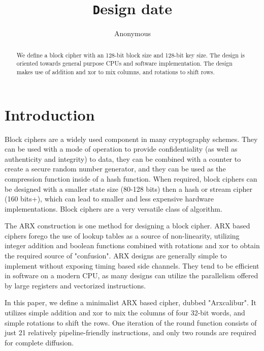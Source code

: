 \documentclass[preprint]{iacrtrans}
\author{Anonymous\inst{1}}
\institute{City, State \email{address@provider.com}}
\title[\texttt Design date]{\texttt Design date}
\begin{document}
\maketitle


\begin{abstract}
  We define a block cipher with an 128-bit block size and 128-bit key size. The design is oriented towards general purpose CPUs and software implementation. The design makes use of addition and xor to mix columns, and rotations to shift rows. \\ 
\end{abstract}

\todototoc
\listoftodos

\section{Introduction}
 Block ciphers are a widely used component in many cryptography schemes. They can be used with a mode of operation to provide confidentiality (as well as authenticity and integrity) to data, they can be combined with a counter to create a secure random number generator, and they can be used as the compression function inside of a hash function. When required, block ciphers can be designed with a smaller state size (80-128 bits) then a hash or stream cipher (160 bits+), which can lead to smaller and less expensive hardware implementations. Block ciphers are a very versatile class of algorithm.

The ARX construction is one method for designing a block cipher. ARX based ciphers forego the use of lookup tables as a source of non-linearity, utilizing integer addition and boolean functions combined with rotations and xor to obtain the required source of "confusion". ARX designs are generally simple to implement without exposing timing based side channels. They tend to be efficient in software on a modern CPU, as many designs can utilize the parallelism offered by large registers and vectorized instructions. 

In this paper, we define a minimalist ARX based cipher, dubbed "Arxcalibur". It utilizes simple addition and xor to mix the columns of four 32-bit words, and simple rotations to shift the rows. One iteration of the round function consists of just 21 relatively pipeline-friendly instructions, and only two rounds are required for complete diffusion. 
\end{document}
